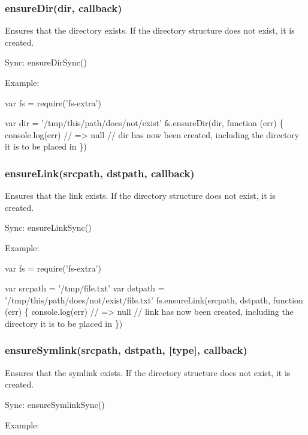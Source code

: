 \subsubsection*{ensure\+Dir(dir, callback)}

Ensures that the directory exists. If the directory structure does not exist, it is created.

Sync\+: {\ttfamily ensure\+Dir\+Sync()}

Example\+:


\begin{DoxyCode}
var fs = require(\textcolor{stringliteral}{'fs-extra'})

var dir = '/tmp/this/path/does/not/exist'
fs.ensureDir(dir, function (err) \{
  console.log(err) \textcolor{comment}{// => null}
  \textcolor{comment}{// dir has now been created, including the directory it is to be placed in}
\})
\end{DoxyCode}


\subsubsection*{ensure\+Link(srcpath, dstpath, callback)}

Ensures that the link exists. If the directory structure does not exist, it is created.

Sync\+: {\ttfamily ensure\+Link\+Sync()}

Example\+:


\begin{DoxyCode}
var fs = require(\textcolor{stringliteral}{'fs-extra'})

var srcpath = '/tmp/file.txt'
var dstpath = '/tmp/this/path/does/not/exist/file.txt'
fs.ensureLink(srcpath, dstpath, function (err) \{
  console.log(err) \textcolor{comment}{// => null}
  \textcolor{comment}{// link has now been created, including the directory it is to be placed in}
\})
\end{DoxyCode}


\subsubsection*{ensure\+Symlink(srcpath, dstpath, \mbox{[}type\mbox{]}, callback)}

Ensures that the symlink exists. If the directory structure does not exist, it is created.

Sync\+: {\ttfamily ensure\+Symlink\+Sync()}

Example\+:


